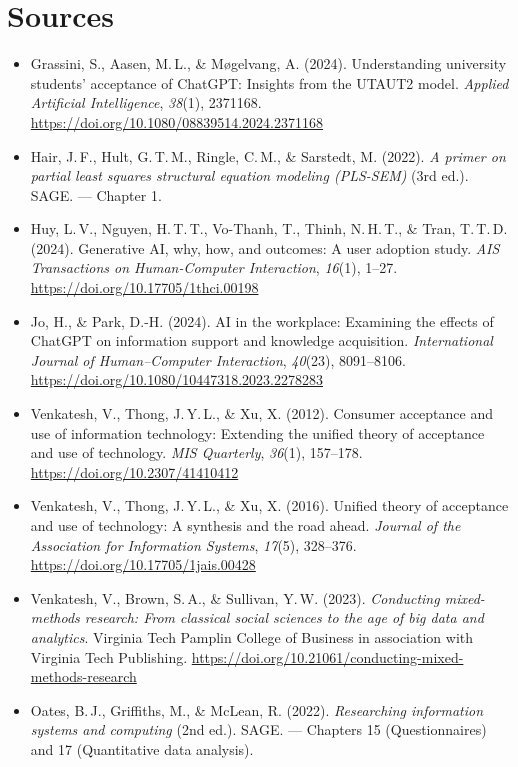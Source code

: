\documentclass[11pt,a4paper,british,twoside=false,headings=small,chapterprefix=false,numbers=noenddot]{scrbook}
\begin{document}
\section*{Sources}
\begin{itemize}\small
  \item Grassini, S., Aasen, M.\,L., \& M\o gelvang, A. (2024). Understanding university students' acceptance of ChatGPT: Insights from the UTAUT2 model. \emph{Applied Artificial Intelligence}, \emph{38}(1), 2371168. \url{https://doi.org/10.1080/08839514.2024.2371168}
  \item Hair, J.\,F., Hult, G.\,T.\,M., Ringle, C.\,M., \& Sarstedt, M. (2022). \emph{A primer on partial least squares structural equation modeling (PLS-SEM)} (3rd ed.). SAGE. --- Chapter 1.
  \item Huy, L.\,V., Nguyen, H.\,T.\,T., Vo-Thanh, T., Thinh, N.\,H.\,T., \& Tran, T.\,T.\,D. (2024). Generative AI, why, how, and outcomes: A user adoption study. \emph{AIS Transactions on Human-Computer Interaction}, \emph{16}(1), 1--27. \url{https://doi.org/10.17705/1thci.00198}
  \item Jo, H., \& Park, D.-H. (2024). AI in the workplace: Examining the effects of ChatGPT on information support and knowledge acquisition. \emph{International Journal of Human--Computer Interaction}, \emph{40}(23), 8091--8106. \url{https://doi.org/10.1080/10447318.2023.2278283}
  \item Venkatesh, V., Thong, J.\,Y.\,L., \& Xu, X. (2012). Consumer acceptance and use of information technology: Extending the unified theory of acceptance and use of technology. \emph{MIS Quarterly}, \emph{36}(1), 157--178. \url{https://doi.org/10.2307/41410412}
  \item Venkatesh, V., Thong, J.\,Y.\,L., \& Xu, X. (2016). Unified theory of acceptance and use of technology: A synthesis and the road ahead. \emph{Journal of the Association for Information Systems}, \emph{17}(5), 328--376. \url{https://doi.org/10.17705/1jais.00428}
  \item Venkatesh, V., Brown, S.\,A., \& Sullivan, Y.\,W. (2023). \emph{Conducting mixed-methods research: From classical social sciences to the age of big data and analytics}. Virginia Tech Pamplin College of Business in association with Virginia Tech Publishing. \url{https://doi.org/10.21061/conducting-mixed-methods-research}
  \item Oates, B.\,J., Griffiths, M., \& McLean, R. (2022). \emph{Researching information systems and computing} (2nd ed.). SAGE. --- Chapters 15 (Questionnaires) and 17 (Quantitative data analysis).
\end{itemize}
\end{document}
